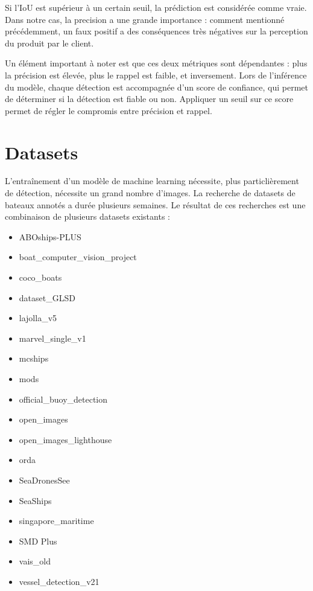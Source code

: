 Si l'IoU est supérieur à un certain seuil, la prédiction est considérée comme vraie.\\

Dans notre cas, la precision a une grande importance : comment mentionné précédemment, 
un faux positif a des conséquences très négatives sur la perception du produit par le client.

Un élément important à noter est que ces deux métriques sont dépendantes : plus la précision est élevée,
plus le rappel est faible, et inversement. Lors de l'inférence du modèle, chaque détection est accompagnée
d'un score de confiance, qui permet de déterminer si la détection est fiable ou non. Appliquer un seuil
sur ce score permet de régler le compromis entre précision et rappel.\\

\section{Datasets}

L'entraînement d'un modèle de machine learning nécessite, plus particlièrement de détection, nécessite un grand
nombre d'images. 
La recherche de datasets de bateaux annotés a durée plusieurs semaines. Le résultat de ces recherches 
est une combinaison de plusieurs datasets existants : 
\begin{itemize}
    \item ABOships-PLUS
    \item boat\_computer\_vision\_project
    \item coco\_boats
    \item dataset\_GLSD
    \item lajolla\_v5
    \item marvel\_single\_v1
    \item mcships
    \item mods
    \item official\_buoy\_detection
    \item open\_images
    \item open\_images\_lighthouse
    \item orda
    \item SeaDronesSee
    \item SeaShips
    \item singapore\_maritime
    \item SMD Plus
    \item vais\_old
    \item vessel\_detection\_v21
\end{itemize}

